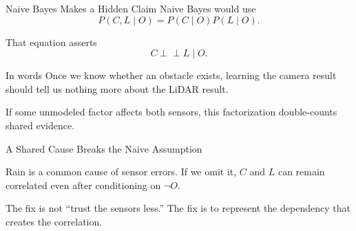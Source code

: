 \documentclass[aspectratio=169,10pt]{beamer}
\begin{document}
\begin{frame}[shrink=10]{Naive Bayes Makes a Hidden Claim}
  Naive Bayes would use
  \[
    P(C,L\mid O)=P(C\mid O)P(L\mid O).
  \]

  That equation asserts
  \[
    C \perp\!\!\!\perp L \mid O.
  \]

  \begin{block}{In words}
    Once we know whether an obstacle exists, learning the camera result should tell us nothing more about the LiDAR result.
  \end{block}

  \begin{center}
  \end{center}

  \begin{keyidea}
    If some unmodeled factor affects both sensors, this factorization double-counts shared evidence.
  \end{keyidea}
\end{frame}

\begin{frame}[shrink=10]{A Shared Cause Breaks the Naive Assumption}
  \begin{center}
  \end{center}

  Rain is a common cause of sensor errors. If we omit it, $C$ and $L$ can remain correlated even after conditioning on $\neg O$.

  \begin{keyidea}
    The fix is not ``trust the sensors less.'' The fix is to represent the dependency that creates the correlation.
  \end{keyidea}
\end{frame}
\end{document}
